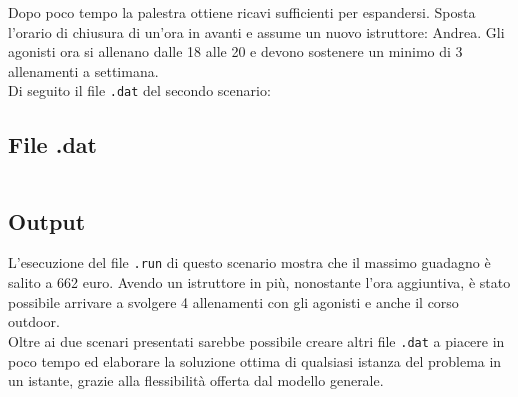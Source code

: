 Dopo poco tempo la palestra ottiene ricavi sufficienti per espandersi. Sposta l'orario di chiusura di un'ora in avanti e assume un nuovo istruttore: Andrea. Gli agonisti ora si allenano dalle 18 alle 20 e devono sostenere un minimo di 3 allenamenti a settimana. \\
Di seguito il file \texttt{.dat} del secondo scenario:

\subsection{File .dat}
\inputminted[bgcolor=bg, breaklines, fontsize=\small]{haskell}{ampl/scenario-2.dat}

\subsection{Output}
L'esecuzione del file \texttt{.run} di questo scenario mostra che il massimo guadagno è salito a 662 euro. Avendo un istruttore in più, nonostante l'ora aggiuntiva, è stato possibile arrivare a svolgere 4 allenamenti con gli agonisti e anche il corso outdoor. \\
Oltre ai due scenari presentati sarebbe possibile creare altri file \texttt{.dat} a piacere in poco tempo ed elaborare la soluzione ottima di qualsiasi istanza del problema in un istante, grazie alla flessibilità offerta dal modello generale.

